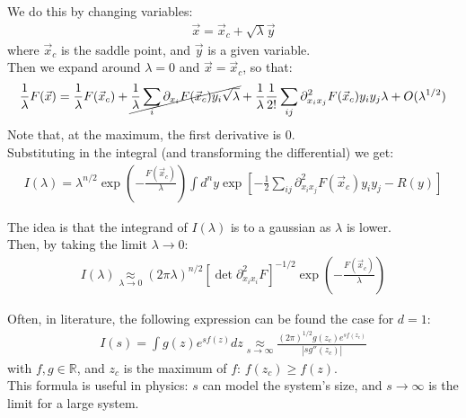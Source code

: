 \documentclass[../template.tex]{subfiles}
\begin{document}
We do this by changing variables:
\begin{align*}
    \vec{x} = \vec{x}_c + \sqrt{\lambda} \vec{y}
\end{align*}
where $\vec{x}_c$ is the saddle point, and $\vec{y}$ is a given variable.\\
Then we expand around $\lambda = 0$ and $\vec{x} = \vec{x}_c$, so that:
\begin{align*}
    \frac{1}{\lambda}F(\vec{x}) = \frac{1}{\lambda}F(\vec{x}_c) + \cancel{\frac{1}{\lambda}\sum_i \partial_{x_i} F(\vec{x}_c) y_i \sqrt{\lambda} }+ \frac{1}{\lambda}\frac{1}{2!} \sum_{ij} \partial^2_{x_i x_j} F(\vec{x}_c) y_i y_j \lambda + O(\lambda^{1/2})     
\end{align*}    
Note that, at the maximum, the first derivative is $0$.\\
Substituting in the integral (and transforming the differential) we get:
\begin{align*}
    I(\lambda) = \lambda^{n/2} \exp\left(-\frac{F(\vec{x}_c)}{\lambda} \right) \int d^n y \exp\left[-\frac{1}{2} \sum_{ij} \partial^2_{x_ix_j} F(\vec{x}_c) y_i y_j - R(y) \right]
\end{align*}

The idea is that the integrand of $I(\lambda)$ is  to a gaussian as $\lambda$ is lower.\\

Then, by taking the limit $\lambda \to 0$:
\begin{align*}
    I(\lambda) \underset{\lambda \to 0}{\approx} (2\pi \lambda)^{n/2} [\operatorname{det} \partial^2_{x_i x_i} F ]^{-1/2} \exp\left(-\frac{F(\vec{x}_c)}{\lambda} \right)
\end{align*} 

Often, in literature, the following expression can be found the case for $d=1$: 
\begin{align*}
    I(s) = \int g(z) e^{s f(z)} dz \underset{s \to \infty }{\approx}  \frac{(2\pi)^{1/2} g(z_c) e^{s f(z_c)}}{|s g''(z_c)|}
\end{align*}
with $f, g \in \mathbb{R}$, and $z_c$ is the maximum of $f$: $f(z_c) \geq f(z)$.\\
This formula is useful in physics: $s$ can model the system's size, and $s \to\infty$ is the limit for a large system.\\
\end{document}
